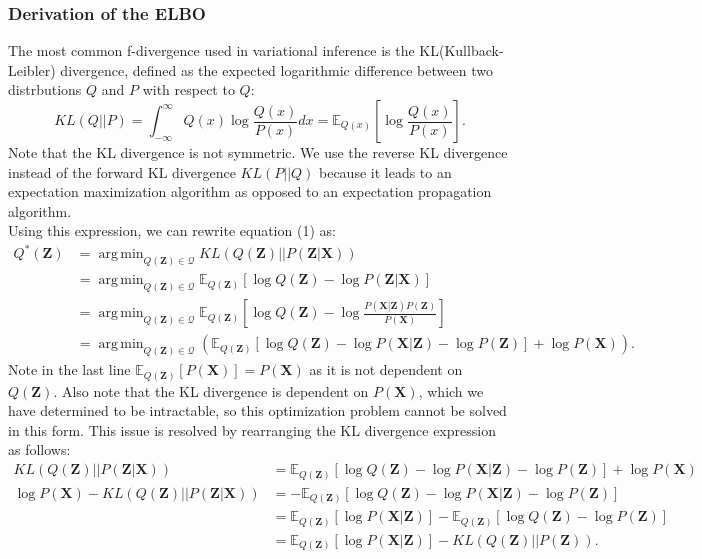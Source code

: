 \documentclass[a4paper,12pt]{article}
\DeclareMathOperator*{\argmin}{arg\,min}
\begin{document}
\subsubsection{Derivation of the ELBO}
The most common f-divergence used in variational inference is the KL(Kullback-Leibler) divergence, defined as the expected logarithmic difference between two distrbutions $Q$ and $P$ with respect to $Q$:
\begin{equation*}
KL(Q||P)=\int_{-\infty}^\infty Q(x)\log \frac{Q(x)}{P(x)}dx=\mathbb{E}_{Q(x)}\left[\log\frac{Q(x)}{P(x)}\right].
\end{equation*}
Note that the KL divergence is not symmetric. We use the reverse KL divergence instead of the forward KL divergence $KL(P||Q)$ because it leads to an expectation maximization algorithm as opposed to an expectation propagation algorithm.\\
Using this expression, we can rewrite equation (1) as:
\begin{align*}
Q^*(\textbf{Z})&=\argmin_{Q(\textbf{Z})\in \mathcal{Q}}KL(Q(\textbf{Z})||P(\textbf{Z}|\textbf{X}))\\
&= \argmin_{Q(\textbf{Z})\in \mathcal{Q}} \mathbb{E}_{Q(\textbf{Z})}[\log Q(\textbf{Z})-\log P(\textbf{Z}|\textbf{X})]\\
&= \argmin_{Q(\textbf{Z})\in \mathcal{Q}} \mathbb{E}_{Q(\textbf{Z})}\left[\log Q(\textbf{Z})-\log\frac{P(\textbf{X}|\textbf{Z})P(\textbf{Z})}{P(\textbf{X})}\right]\\
&= \argmin_{Q(\textbf{Z})\in \mathcal{Q}} \left(\mathbb{E}_{Q(\textbf{Z})}[\log Q(\textbf{Z})-\log P(\textbf{X}|\textbf{Z})-\log P(\textbf{Z})]+\log P(\textbf{X})\right).
\end{align*}
Note in the last line $\mathbb{E}_{Q(\textbf{Z})}[P(\textbf{X})]=P(\textbf{X})$ as it is not dependent on $Q(\textbf{Z})$. Also note that the KL divergence is dependent on $P(\textbf{X})$, which we have determined to be intractable, so this optimization problem cannot be solved in this form. This issue is resolved by rearranging the KL divergence expression as follows:
\begin{align}
KL(Q(\textbf{Z})||P(\textbf{Z}|\textbf{X}))&=\mathbb{E}_{Q(\textbf{Z})}[\log Q(\textbf{Z})-\log P(\textbf{X}|\textbf{Z})-\log P(\textbf{Z})]+\log P(\textbf{X}) \nonumber \\
\log P(\textbf{X})-KL(Q(\textbf{Z})||P(\textbf{Z}|\textbf{X}))&=-\mathbb{E}_{Q(\textbf{Z})}[\log Q(\textbf{Z})-\log P(\textbf{X}|\textbf{Z})-\log P(\textbf{Z})]\nonumber \\
&=\mathbb{E}_{Q(\textbf{Z})}[\log P(\textbf{X}|\textbf{Z})]-\mathbb{E}_{Q(\textbf{Z})}[\log Q(\textbf{Z})-\log P(\textbf{Z})]\nonumber \\
&=\mathbb{E}_{Q(\textbf{Z})}[\log P(\textbf{X}|\textbf{Z})]-KL(Q(\textbf{Z})||P(\textbf{Z})).
\end{align}
\end{document}
